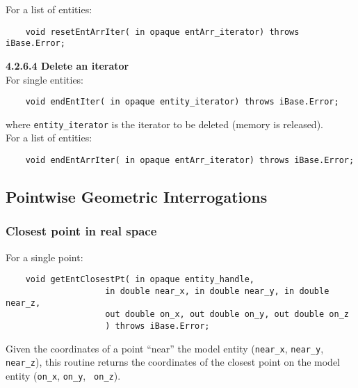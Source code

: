 \documentclass{article}
\begin{document}
\hspace{-16pt}For a list of entities:

\begin{verbatim}
    void resetEntArrIter( in opaque entArr_iterator) throws iBase.Error;
\end{verbatim}

\hspace{-16pt} \textbf{4.2.6.4 Delete an iterator}\\

\hspace{-16pt}For single entities:

\begin{verbatim}
    void endEntIter( in opaque entity_iterator) throws iBase.Error;
\end{verbatim}
where {\tt entity\_iterator} is the iterator to be deleted 
(memory is released).\\

\hspace{-16pt}For a list of entities:

\begin{verbatim}    
    void endEntArrIter( in opaque entArr_iterator) throws iBase.Error;
\end{verbatim}

\subsection{Pointwise Geometric Interrogations}

\subsubsection{Closest point in real space}

For a single point:

\begin{verbatim}
    void getEntClosestPt( in opaque entity_handle, 
                    in double near_x, in double near_y, in double near_z,
                    out double on_x, out double on_y, out double on_z
                    ) throws iBase.Error;
\end{verbatim}
Given the coordinates of a point ``near'' the model entity 
({\tt near\_x}, {\tt near\_y}, {\tt near\_z}), this routine returns the coordinates 
of the closest point on the model entity ({\tt on\_x}, {\tt on\_y}, {\tt
  on\_z}).
\end{document}
